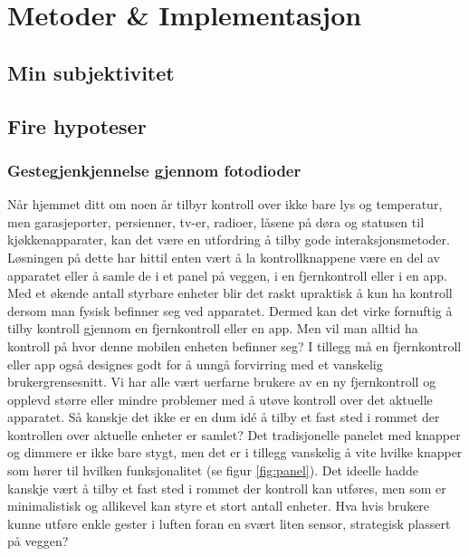 \section[Metoder \& Implementasjon]{Metoder \& Implementasjon}
\subsection{Min subjektivitet}




\subsection{Fire hypoteser}
\subsubsection{Gestegjenkjennelse gjennom fotodioder}
Når hjemmet ditt om noen år tilbyr kontroll over ikke bare lys og temperatur, men garasjeporter, persienner, tv-er, radioer, låsene på døra og statusen til kjøkkenapparater, kan det være en utfordring å tilby gode interaksjonsmetoder. Løsningen på dette har hittil enten vært å la kontrollknappene være en del av apparatet eller å samle de i et panel på veggen, i en fjernkontroll eller i en app. Med et økende antall styrbare enheter blir det raskt upraktisk å kun ha kontroll dersom man fysisk befinner seg ved apparatet. Dermed kan det virke fornuftig å tilby kontroll gjennom en fjernkontroll eller en app. Men vil man alltid ha kontroll på hvor denne mobilen enheten befinner seg? I tillegg må en fjernkontroll eller app også designes godt for å unngå forvirring med et vanskelig brukergrensesnitt. Vi har alle vært uerfarne brukere av en ny fjernkontroll og opplevd større eller mindre problemer med å utøve kontroll over det aktuelle apparatet. Så kanskje det ikke er en dum idé å tilby et fast sted i rommet der kontrollen over aktuelle enheter er samlet? Det tradisjonelle panelet med knapper og dimmere er ikke bare stygt, men det er i tillegg vanskelig å vite hvilke knapper som hører til hvilken funksjonalitet (se figur \ref{fig:panel}). Det ideelle hadde kanskje vært å tilby et fast sted i rommet der kontroll kan utføres, men som er minimalistisk og allikevel kan styre et stort antall enheter. Hva hvis brukere kunne utføre enkle gester i luften foran en svært liten sensor, strategisk plassert på veggen?
